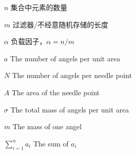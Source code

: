 
\begin{notation}

  \begin{notationlist}{2em}
    \item[$n$] 集合中元素的数量
    \item[$m$] 过滤器/不经意随机存储的长度
    \item[$\alpha$] 负载因子，$\alpha = n / m$
    \item[$\displaystyle a$] The number of angels per unit area
    \item[$\displaystyle N$] The number of angels per needle point
    \item[$\displaystyle A$] The area of the needle point
    \item[$\displaystyle \sigma$] The total mass of angels per unit area
    \item[$\displaystyle m$] The mass of one angel
    \item[$\displaystyle \sum_{i=1}^n a_i$] The sum of $a_i$
  \end{notationlist}

\end{notation}





